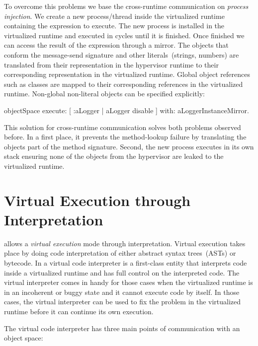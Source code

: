 To overcome this problems we base the cross-runtime communication on \emph{process injection}. We create a new process/thread inside the virtualized runtime containing the expression to execute. The new process is installed in the virtualized runtime and executed in cycles until it is finished. Once finished we can access the result of the expression through a mirror. The objects that conform the message-send signature and other literals~(\eg strings, numbers) are translated from their representation in the hypervisor runtime to their corresponding representation in the virtualized runtime. Global object references such as classes are mapped to their corresponding references in the virtualized runtime. Non-global non-literal objects can be specified explicitly:

\begin{code}
objectSpace
	execute: [ :aLogger | aLogger disable ]
	with: aLoggerInstanceMirror.
\end{code}

This solution for cross-runtime communication solves both problems observed before. In a first place, it prevents the method-lookup failure by translating the objects part of the method signature. Second, the new process executes in its own stack ensuring none of the objects from the hypervisor are leaked to the virtualized runtime.

\section{Virtual Execution through Interpretation} \label{sec:interpretation}

\Vtt allows a \emph{virtual execution} mode through interpretation. Virtual execution takes place by doing code interpretation of either abstract syntax trees~(ASTs) or bytecode. In \Vtt a virtual code interpreter is a first-class entity that interprets code inside a virtualized runtime and has full control on the interpreted code. The virtual interpreter comes in handy for those cases when the virtualized runtime is in an incoherent or buggy state and it cannot execute code by itself. In those cases, the virtual interpreter can be used to fix the problem in the virtualized runtime before it can continue its own execution.

The virtual code interpreter has three main points of communication with an object space:

